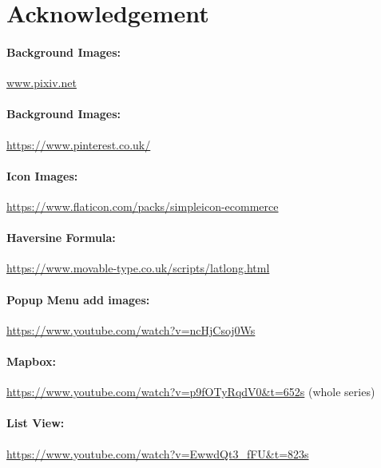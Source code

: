 \documentclass[12pt]{article}
\begin{document}
%
%
\section{Acknowledgement}
\paragraph{Background Images:}
\href{www.pixiv.net}{www.pixiv.net}
\paragraph{Background Images:}
\href{https://www.pinterest.co.uk/}{https://www.pinterest.co.uk/}
\paragraph{Icon Images:} \href{https://www.flaticon.com/packs/simpleicon-ecommerce}{https://www.flaticon.com/packs/simpleicon-ecommerce}
\paragraph{Haversine Formula:}
\href{https://www.movable-type.co.uk/scripts/latlong.html}{https://www.movable-type.co.uk/scripts/latlong.html}
\paragraph{Popup Menu add images:}
\href{https://www.youtube.com/watch?v=ncHjCsoj0Ws}{https://www.youtube.com/watch?v=ncHjCsoj0Ws}
\paragraph{Mapbox:}
\href{https://www.youtube.com/watch?v=p9fOTyRqdV0\&t=652s}{https://www.youtube.com/watch?v=p9fOTyRqdV0\&t=652s} (whole series)
\paragraph{List View:}
\href{https://www.youtube.com/watch?v=EwwdQt3\_fFU\&t=823s}{https://www.youtube.com/watch?v=EwwdQt3\_fFU\&t=823s}
	
\end{document}
